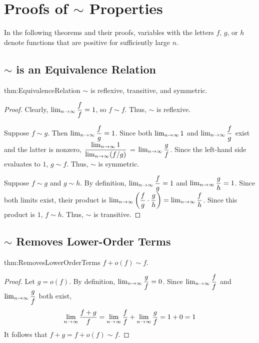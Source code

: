\appendix
\appendixpage

\section{Proofs of $\sim$ Properties}

{\HdrNote} In the following theorems and their proofs, variables with the letters $f$, $g$, or $h$ denote functions that are positive for sufficiently large $n$.

\subsection{$\sim$ is an Equivalence Relation}

\begin{reptheorem}{thm:EquivalenceRelation}
	$\sim$ is reflexive, transitive, and symmetric.
\end{reptheorem}

\begin{proof}
	Clearly, $\lim_{n \to \infty} \dfrac{f}{f} = 1$, so $f \sim f$. Thus, $\sim$ is reflexive.
	
	Suppose $f \sim g$. Then $\lim_{n \to \infty} \dfrac{f}{g} = 1$. Since both $\lim_{n \to \infty} 1$ and $\lim_{n \to \infty} \dfrac{f}{g}$ exist and the latter is nonzero, $\dfrac{\lim_{n \to \infty} 1}{\lim_{n \to \infty} (f / g)}$ = $\lim_{n \to \infty} \dfrac{g}{f}$. Since the left-hand side evaluates to $1$, $g \sim f$. Thus, $\sim$ is symmetric.
	
	Suppose $f \sim g$ and $g \sim h$. By definition, $\lim_{n \to \infty} \dfrac{f}{g} = 1$ and $\lim_{n \to \infty} \dfrac{g}{h} = 1$. Since both limits exist, their product is $\lim_{n \to \infty} \left( \dfrac{f}{g} \cdot \dfrac{g}{h} \right) = \lim_{n \to \infty} \dfrac{f}{h}$. Since this product is $1$, $f \sim h$. Thus, $\sim$ is transitive.
\end{proof}

\subsection{$\sim$ Removes Lower-Order Terms}

\begin{reptheorem}{thm:RemovesLowerOrderTerms}
	$f + o(f) \sim f$.
\end{reptheorem}

\begin{proof}
	Let $g = o(f)$. By definition, $\lim_{n \to \infty} \dfrac{g}{f} = 0$. Since $\lim_{n \to \infty} \dfrac{f}{f}$ and $\lim_{n \to \infty} \dfrac{g}{f}$ both exist,
	\begin{align*}
	\lim_{n \to \infty} \dfrac{f + g}{f} = \lim_{n \to \infty} \dfrac{f}{f} + \lim_{n \to \infty} \dfrac{g}{f} = 1 + 0 = 1
	\end{align*}
	It follows that $f + g = f + o(f) \sim f$.
\end{proof}

